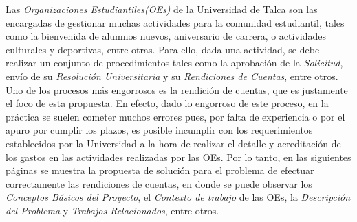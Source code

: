 Las \emph{Organizaciones Estudiantiles(OEs)} de la Universidad de Talca son las encargadas de gestionar muchas actividades para la comunidad estudiantil, tales como la bienvenida de alumnos nuevos, aniversario de carrera, o actividades culturales y deportivas, entre otras. Para ello, dada una actividad, se debe realizar un conjunto de procedimientos tales como la aprobación de la \emph{Solicitud}, envío de su \emph{Resolución Universitaria} y su \emph{Rendiciones de Cuentas}, entre otros. Uno de los procesos más engorrosos es la rendición de cuentas, que es justamente el foco de esta propuesta. En efecto, dado lo engorroso de este proceso, en la práctica se suelen cometer muchos errores pues, por falta de experiencia o por el apuro por cumplir los plazos, es posible incumplir con los requerimientos establecidos por la Universidad a la hora de realizar el detalle y acreditación de los gastos en las actividades realizadas por las OEs. Por lo tanto, en las siguientes páginas se muestra la propuesta de solución para el problema de efectuar correctamente las rendiciones de cuentas, en donde se puede observar los \emph{Conceptos Básicos del Proyecto}, el \emph{Contexto de trabajo} de las OEs, la \emph{Descripción del Problema} y \emph{Trabajos Relacionados}, entre otros.